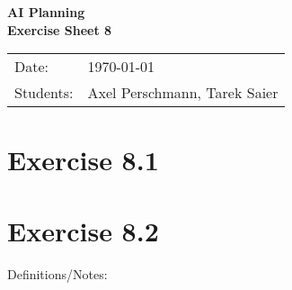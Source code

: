 \documentclass[11pt,a4paper]{article}
\newcommand{\sheetNr}{8}
\begin{document}
\begin{center}
\Huge{\textbf{AI Planning}}\\
\LARGE{\textbf{Exercise Sheet \sheetNr}}
\end{center}
\vspace{2cm}
\begin{tabular}{ll}
Date: & \today\\
Students: & Axel Perschmann, Tarek Saier
\end{tabular}

\section*{Exercise 8.1}

\section*{Exercise 8.2}
Definitions/Notes:
\end{document}
